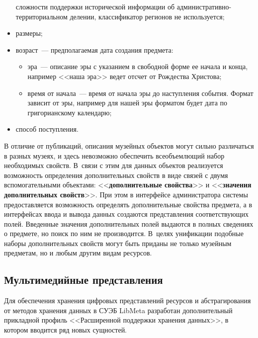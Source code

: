 \begin{multicols}{2}
\begin{itemize}
сложности поддержки исторической информации об ад\-ми\-ни\-ст\-ра\-тив\-но-тер\-ри\-то\-ри\-аль\-ном 
делении, классификатор регионов не использу\-ется;\\[-14pt]
\item размеры;\\[-14pt]
\item возраст~--- предполагаемая дата создания предмета:\\[-14pt]
\begin{itemize}
\item эра~--- описание эры с указанием в свободной форме ее начала и конца, например <<наша эра>> 
ведет отсчет от Рождества Христова;\\[-14pt]
\item время от начала~--- время от начала эры до наступления события. Формат зависит от эры, например 
для нашей эры форматом будет дата по григорианскому календарю;\\[-14pt]
\end{itemize}
\item способ поступления.
\end{itemize}

  В отличие от публикаций, описания музейных объектов могут сильно различаться в 
разных музеях, и здесь невозможно обеспечить всеобъемлющий набор необходимых 
свойств. В~связи с этим для данных объектов реализуется возможность определения 
дополнительных свойств в виде связей с двумя вспомогательными объектами: 
<<\textbf{дополнительные свойства}>> и <<\textbf{значения дополнительных 
свойств}>>. При этом в интерфейсе администратора системы предоставляется возможность 
определять дополнительные свойства предмета, а в интерфейсах ввода и вывода данных 
создаются представления соответствующих полей. Введенные значения дополнительных 
полей выдаются в полных сведениях о предмете, но поиск по ним не производится. В~целях 
унификации подобные наборы дополнительных свойств могут быть приданы не только 
музейным предметам, но и любым другим видам ресурсов.

\vspace*{-6pt}
  
  \subsection*{Мультимедийные представления}
  
  Для обеспечения хранения цифровых пред\-став\-ле\-ний ресурсов и абстрагирования от 
методов хранения данных в СУЭБ LibMeta разработан дополнительный прикладной профиль 
<<Расширенной поддержки хранения данных>>, в котором вводится ряд новых сущностей.
  

\end{multicols}
